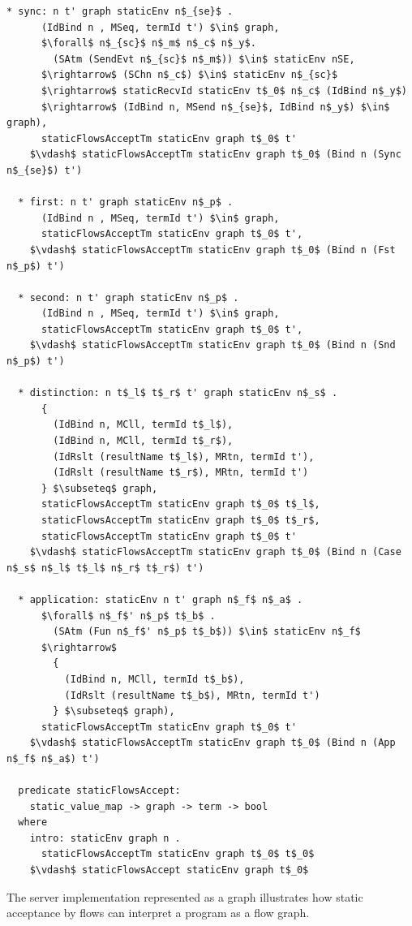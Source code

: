 \documentclass[letterpaper, 11pt]{extarticle}
\begin{document}
\begin{lstlisting}[language=logic, mathescape]
  * sync: n t' graph staticEnv n$_{se}$ .
      (IdBind n , MSeq, termId t') $\in$ graph,
      $\forall$ n$_{sc}$ n$_m$ n$_c$ n$_y$.
        (SAtm (SendEvt n$_{sc}$ n$_m$)) $\in$ staticEnv nSE,
      $\rightarrow$ (SChn n$_c$) $\in$ staticEnv n$_{sc}$
      $\rightarrow$ staticRecvId staticEnv t$_0$ n$_c$ (IdBind n$_y$)
      $\rightarrow$ (IdBind n, MSend n$_{se}$, IdBind n$_y$) $\in$ graph),
      staticFlowsAcceptTm staticEnv graph t$_0$ t'
    $\vdash$ staticFlowsAcceptTm staticEnv graph t$_0$ (Bind n (Sync n$_{se}$) t')

  * first: n t' graph staticEnv n$_p$ .
      (IdBind n , MSeq, termId t') $\in$ graph,
      staticFlowsAcceptTm staticEnv graph t$_0$ t',
    $\vdash$ staticFlowsAcceptTm staticEnv graph t$_0$ (Bind n (Fst n$_p$) t')

  * second: n t' graph staticEnv n$_p$ .
      (IdBind n , MSeq, termId t') $\in$ graph,
      staticFlowsAcceptTm staticEnv graph t$_0$ t',
    $\vdash$ staticFlowsAcceptTm staticEnv graph t$_0$ (Bind n (Snd n$_p$) t')

  * distinction: n t$_l$ t$_r$ t' graph staticEnv n$_s$ .
      {
        (IdBind n, MCll, termId t$_l$),
        (IdBind n, MCll, termId t$_r$),
        (IdRslt (resultName t$_l$), MRtn, termId t'),
        (IdRslt (resultName t$_r$), MRtn, termId t')
      } $\subseteq$ graph,
      staticFlowsAcceptTm staticEnv graph t$_0$ t$_l$,
      staticFlowsAcceptTm staticEnv graph t$_0$ t$_r$,
      staticFlowsAcceptTm staticEnv graph t$_0$ t'
    $\vdash$ staticFlowsAcceptTm staticEnv graph t$_0$ (Bind n (Case n$_s$ n$_l$ t$_l$ n$_r$ t$_r$) t')

  * application: staticEnv n t' graph n$_f$ n$_a$ .
      $\forall$ n$_f$' n$_p$ t$_b$ . 
        (SAtm (Fun n$_f$' n$_p$ t$_b$)) $\in$ staticEnv n$_f$
      $\rightarrow$
        {
          (IdBind n, MCll, termId t$_b$),
          (IdRslt (resultName t$_b$), MRtn, termId t')
        } $\subseteq$ graph),
      staticFlowsAcceptTm staticEnv graph t$_0$ t'
    $\vdash$ staticFlowsAcceptTm staticEnv graph t$_0$ (Bind n (App n$_f$ n$_a$) t')

  predicate staticFlowsAccept:
    static_value_map -> graph -> term -> bool
  where
    intro: staticEnv graph n .
      staticFlowsAcceptTm staticEnv graph t$_0$ t$_0$
    $\vdash$ staticFlowsAccept staticEnv graph t$_0$ 

\end{lstlisting}

The server implementation represented as a graph illustrates how static acceptance by
flows can interpret a program as a flow graph.
\end{document}
